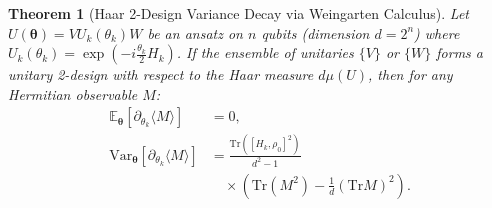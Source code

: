 \documentclass[journal]{IEEEtran}
\newtheorem{theorem}{Theorem}
\begin{document}
\begin{theorem}[Haar 2-Design Variance Decay via Weingarten Calculus]
Let $U(\boldsymbol{\theta}) = V U_k(\theta_k) W$ be an ansatz on $n$ qubits (dimension $d = 2^n$) where $U_k(\theta_k) = \exp(-i \frac{\theta_k}{2} H_k)$. If the ensemble of unitaries $\{V\}$ or $\{W\}$ forms a unitary 2-design with respect to the Haar measure $d\mu(U)$, then for any Hermitian observable $M$:
\begin{align}
\mathbb{E}_{\boldsymbol{\theta}}\left[ \partial_{\theta_k} \langle M \rangle \right] &= 0, \\
\mathrm{Var}_{\boldsymbol{\theta}}\left[ \partial_{\theta_k} \langle M \rangle \right] &= \frac{\mathrm{Tr}\left([H_k, \rho_0]^2\right)}{d^2 - 1} \nonumber \\
&\quad \times \left( \mathrm{Tr}(M^2) - \frac{1}{d}(\mathrm{Tr} M)^2 \right).
\label{eq:weingarten_exact_variance}
\end{align}
\end{theorem}
\end{document}
